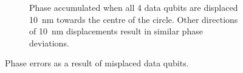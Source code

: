 \begin{figure}
\begin{subfigure}[t]{0.7\textwidth}
		\caption{Phase accumulated when all 4 data qubits are displaced \SI{10}{\nano\metre} towards the centre of the circle. Other directions of \SI{10}{\nano\metre} displacements result in similar phase deviations.}
		\label{fig:inwarddisplacement}
	\end{subfigure}
	
	\caption{Phase errors as a result of misplaced data qubits.}
	\label{fig:overall_displacement}
\end{figure}

